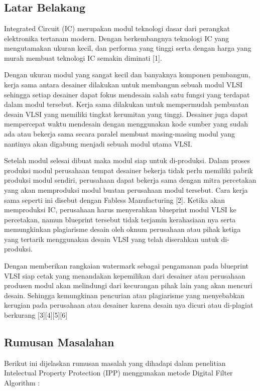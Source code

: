 \chapter{\babSatu}

\section{Latar Belakang}
Integrated Circuit (IC) merupakan modul teknologi dasar dari perangkat elektronika tertanam modern. Dengan berkembangnya teknologi IC yang mengutamakan ukuran kecil, dan performa yang tinggi serta dengan harga yang murah membuat teknologi IC semakin diminati [1].

Dengan ukuran modul yang sangat kecil dan banyaknya komponen pembangun, kerja sama antara desainer dilakukan untuk membangun sebuah modul VLSI sehingga setiap desainer dapat fokus mendesain salah satu fungsi yang terdapat dalam modul tersebut. Kerja sama dilakukan untuk mempermudah pembuatan desain VLSI yang memiliki tingkat kerumitan yang tinggi. Desainer juga dapat mempercepat waktu mendesain dengan menggunakan kode sumber yang sudah ada atau bekerja sama secara paralel membuat masing-masing modul yang nantinya akan digabung menjadi sebuah modul utama VLSI.

Setelah modul selesai dibuat maka modul siap untuk di-produksi. Dalam proses produksi modul perusahaan tempat desainer bekerja tidak perlu memiliki pabrik produksi modul sendiri, perusahaan dapat bekerja sama dengan mitra percetakan yang akan memproduksi modul buatan perusahaan modul tersebut. Cara kerja sama seperti ini disebut dengan Fabless Manufacturing [2]. Ketika akan memproduksi IC, perusahaan harus menyerahkan blueprint modul VLSI ke percetakan, namun blueprint tersebut tidak terjamin kerahasiaan nya serta memungkinkan plagiarisme desain oleh oknum perusahaan atau pihak ketiga yang tertarik menggunakan desain VLSI yang telah diserahkan untuk di-produksi.

Dengan memberikan rangkaian watermark sebagai pengamanan pada blueprint VLSI siap cetak yang menandakan kepemilikan dari desainer atau perusahaan produsen modul akan melindungi dari kecurangan pihak lain yang akan mencuri desain. Sehingga kemungkinan pencurian atau plagiarisme yang menyebabkan kerugian pada perusahaan atau desainer karena desain nya dicuri atau di-plagiat berkurang [3][4][5][6]

\section{Rumusan Masalahan}
Berikut ini dijelaskan rumusan masalah yang dihadapi dalam penelitian Intelectual Property Protection (IPP) menggunakan metode Digital Filter Algorithm :

